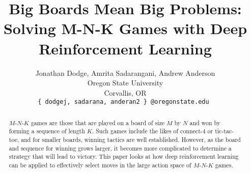 \documentclass[10pt,twocolumn,letterpaper]{article}
\begin{document}
\title{Big Boards Mean Big Problems:\\ Solving M-N-K Games with Deep Reinforcement Learning}

\author{Jonathan Dodge,  Amrita Sadarangani,  Andrew Anderson\\
Oregon State University\\
Corvallis, OR\\
{\tt\small \{ dodgej, sadarana, anderan2 \} @oregonstate.edu }
}

\maketitle

\begin{abstract}
$M$-$N$-$K$ games are those that are played on a board of size $M$ by $N$ and won by forming a sequence of length $K$.
Such games include the likes of connect-4 or tic-tac-toe, and for smaller boards, winning tactics are well established.
However, as the board and sequence for winning grows larger, it becomes more complicated to determine a strategy that will lead to victory.
This paper looks at how deep reinforcement learning can be applied to effectively select moves in the large action space of $M$-$N$-$K$ games.
\end{abstract}







\clearpage

\pagestyle{plain}

\end{document}
